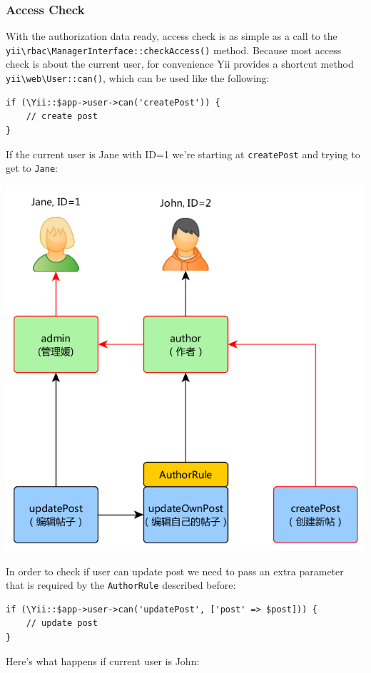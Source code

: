 \subsubsection{Access Check}
With the authorization data ready, access check is as simple as a call to the \texttt{yii{\allowbreak{}\textbackslash}rbac{\allowbreak{}\textbackslash}ManagerInterface\allowbreak{}::\allowbreak{}checkAccess()}
method. Because most access check is about the current user, for convenience Yii provides a shortcut method
\texttt{yii{\allowbreak{}\textbackslash}web{\allowbreak{}\textbackslash}User\allowbreak{}::\allowbreak{}can()}, which can be used like the following:

\lstset{language=php}\begin{lstlisting}
if (\Yii::$app->user->can('createPost')) {
    // create post
}
\end{lstlisting}
If the current user is Jane with ID=1 we're starting at \lstinline|createPost| and trying to get to \lstinline|Jane|:

\noindent\includegraphics[width=\textwidth]{images/rbac-access-check-1.png}

In order to check if user can update post we need to pass an extra parameter that is required by the \lstinline|AuthorRule| described before:

\lstset{language=php}\begin{lstlisting}
if (\Yii::$app->user->can('updatePost', ['post' => $post])) {
    // update post
}
\end{lstlisting}
Here's what happens if current user is John:

